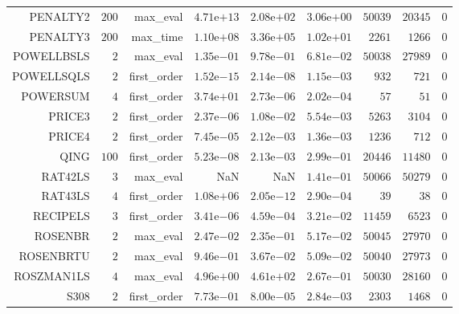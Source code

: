 \begin{longtable}{rrrrrrrrr}
PENALTY2 & \(   200\) & max\_eval & \( 4.71\)e\(+13\) & \( 2.08\)e\(+02\) & \( 3.06\)e\(+00\) & \( 50039\) & \( 20345\) & \(     0\) \\
PENALTY3 & \(   200\) & max\_time & \( 1.10\)e\(+08\) & \( 3.36\)e\(+05\) & \( 1.02\)e\(+01\) & \(  2261\) & \(  1266\) & \(     0\) \\
POWELLBSLS & \(     2\) & max\_eval & \( 1.35\)e\(-01\) & \( 9.78\)e\(-01\) & \( 6.81\)e\(-02\) & \( 50038\) & \( 27989\) & \(     0\) \\
POWELLSQLS & \(     2\) & first\_order & \( 1.52\)e\(-15\) & \( 2.14\)e\(-08\) & \( 1.15\)e\(-03\) & \(   932\) & \(   721\) & \(     0\) \\
POWERSUM & \(     4\) & first\_order & \( 3.74\)e\(+01\) & \( 2.73\)e\(-06\) & \( 2.02\)e\(-04\) & \(    57\) & \(    51\) & \(     0\) \\
PRICE3 & \(     2\) & first\_order & \( 2.37\)e\(-06\) & \( 1.08\)e\(-02\) & \( 5.54\)e\(-03\) & \(  5263\) & \(  3104\) & \(     0\) \\
PRICE4 & \(     2\) & first\_order & \( 7.45\)e\(-05\) & \( 2.12\)e\(-03\) & \( 1.36\)e\(-03\) & \(  1236\) & \(   712\) & \(     0\) \\
QING & \(   100\) & first\_order & \( 5.23\)e\(-08\) & \( 2.13\)e\(-03\) & \( 2.99\)e\(-01\) & \( 20446\) & \( 11480\) & \(     0\) \\
RAT42LS & \(     3\) & max\_eval &       NaN &       NaN & \( 1.41\)e\(-01\) & \( 50066\) & \( 50279\) & \(     0\) \\
RAT43LS & \(     4\) & first\_order & \( 1.08\)e\(+06\) & \( 2.05\)e\(-12\) & \( 2.90\)e\(-04\) & \(    39\) & \(    38\) & \(     0\) \\
RECIPELS & \(     3\) & first\_order & \( 3.41\)e\(-06\) & \( 4.59\)e\(-04\) & \( 3.21\)e\(-02\) & \( 11459\) & \(  6523\) & \(     0\) \\
ROSENBR & \(     2\) & max\_eval & \( 2.47\)e\(-02\) & \( 2.35\)e\(-01\) & \( 5.17\)e\(-02\) & \( 50045\) & \( 27970\) & \(     0\) \\
ROSENBRTU & \(     2\) & max\_eval & \( 9.46\)e\(-01\) & \( 3.67\)e\(-02\) & \( 5.09\)e\(-02\) & \( 50040\) & \( 27973\) & \(     0\) \\
ROSZMAN1LS & \(     4\) & max\_eval & \( 4.96\)e\(+00\) & \( 4.61\)e\(+02\) & \( 2.67\)e\(-01\) & \( 50030\) & \( 28160\) & \(     0\) \\
S308 & \(     2\) & first\_order & \( 7.73\)e\(-01\) & \( 8.00\)e\(-05\) & \( 2.84\)e\(-03\) & \(  2303\) & \(  1468\) & \(     0\) \\

\end{longtable}
